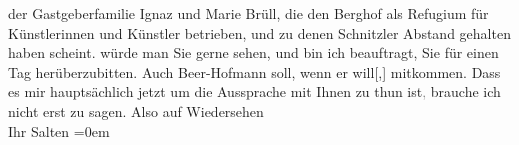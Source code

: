 \begin{ledgroupsized}[t]{13cm}
{{{                  der Gastgeberfamilie Ignaz und Marie Brüll, die den Berghof als Refugium für Künstlerinnen und Künstler
                  betrieben, und zu denen Schnitzler Abstand
                  gehalten haben scheint.}}}\label{K_L03114-2h} würde man Sie gerne sehen, und bin ich beauftragt,
               Sie für einen Tag herüberzubitten. Auch Beer-Hofmann soll, wenn er will{[},{]} mitkommen. Dass es mir
               hauptsächlich jetzt um die Aussprache mit Ihnen zu thun ist\textcolor{gray}{,}
               brauche ich nicht erst zu sagen.\pend
           \pstart
           Also auf Wiedersehen {\\[\baselineskip]}Ihr \spacefill\mbox{Salten}\pend
           \leftskip=0em{}
         
         \endnumbering{}\end{ledgroupsized}  \newcommand{\dateiname}{L03114}\newcommand{\titel}{Felix Salten an Arthur Schnitzler, [25.? 8. 1892]}\newcommand{\editorInnen}{Martin Anton Müller und Laura Untner}
      